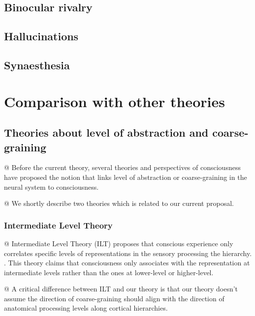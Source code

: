 \documentclass[utf8]{article}
\newenvironment{ants}
			{
			 \begin{easylist}[itemize]		
		 	}
			{
			\end{easylist}
			}
\begin{document}
		\subsection{Binocular rivalry}
		\subsection{Hallucinations}
		\subsection{Synaesthesia}
		
		
		
		
	\section{Comparison with other theories}
	
		\subsection{Theories about level of abstraction and coarse-graining}
			\begin{ants}
				@ Before the current theory, several theories and perspectives of consciousness have proposed the notion that links level of abstraction or coarse-graining in the neural system to consciousness. 
				
				@ We shortly describe two theories which is  related to our current proposal. 
			\end{ants}
			
			
			\subsubsection{Intermediate Level Theory}
				\begin{ants}
					@ Intermediate Level Theory (ILT) proposes that conscious experience only correlates specific levels of representations in the sensory processing the hierarchy. \citep{prinz2007intermediate, jackendoff1987consciousness}. This theory claims that consciousness only associates with the representation at  intermediate levels rather than the ones at lower-level or higher-level. 
					
					
					@ A critical difference between ILT and our theory is that our theory doesn't assume the direction of coarse-graining should align with the direction of  anatomical processing levels along cortical hierarchies.
				\end{ants}
			
\end{document}

